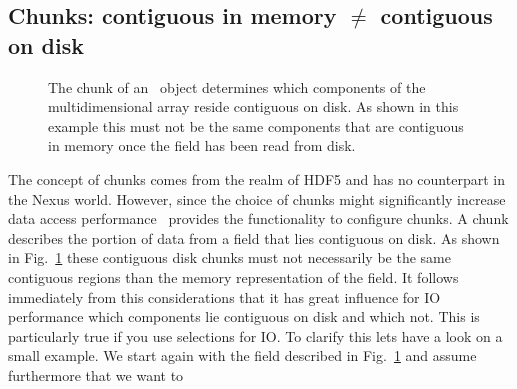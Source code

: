 \subsection{Chunks: contiguous in memory $\ne$ contiguous on disk}
\begin{figure}[tb]
\centering
\begin{minipage}[c]{0.68\linewidth}
\centering
{}
\end{minipage}
\hfill
\begin{minipage}[c]{0.3\linewidth}
\caption{{\small\label{fig:chunk}The chunk of an \nxfield\ object determines
which components of the multidimensional array reside contiguous on disk. 
As shown in this example this must not be the same components that are
contiguous in memory once the field has been read from disk.}}
\end{minipage}
\end{figure}
The concept of chunks comes from the realm of HDF5 and has no counterpart in the
Nexus world. However, since the choice of chunks might significantly
increase data access performance \pninx\ provides the functionality to configure
chunks. A chunk describes the portion of data from a field that lies contiguous
on disk. As shown in Fig.~\ref{fig:chunk} these contiguous disk chunks must not
necessarily be the same contiguous regions than the memory representation of the
field.
It follows immediately from this considerations that it has great influence for
IO performance which components lie contiguous on disk and which not. 
This is particularly true if you use selections for IO. 
To clarify this lets have a look on a small example. We start again with the
field described in Fig.~\ref{fig:chunk} and assume furthermore that we want to
